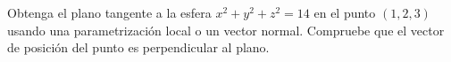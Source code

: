 Obtenga el plano tangente a la esfera $x^2+y^2+z^2=14$ en el punto $(1,2,3)$ usando una parametrización local o un vector normal. Compruebe que el vector de posición del punto es perpendicular al plano.
